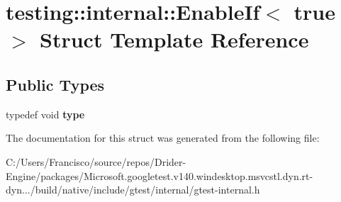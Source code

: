 \hypertarget{structtesting_1_1internal_1_1_enable_if_3_01true_01_4}{}\section{testing\+:\+:internal\+:\+:Enable\+If$<$ true $>$ Struct Template Reference}
\label{structtesting_1_1internal_1_1_enable_if_3_01true_01_4}
\subsection*{Public Types}
\begin{DoxyCompactItemize}
\item 
\mbox{\label{structtesting_1_1internal_1_1_enable_if_3_01true_01_4_a9398d803f1fdd99ff41823746f6299ff}} 
typedef void {\bfseries type}
\end{DoxyCompactItemize}


The documentation for this struct was generated from the following file\+:\begin{DoxyCompactItemize}
\item 
C\+:/\+Users/\+Francisco/source/repos/\+Drider-\/\+Engine/packages/\+Microsoft.\+googletest.\+v140.\+windesktop.\+msvcstl.\+dyn.\+rt-\/dyn.../build/native/include/gtest/internal/gtest-\/internal.\+h\end{DoxyCompactItemize}
